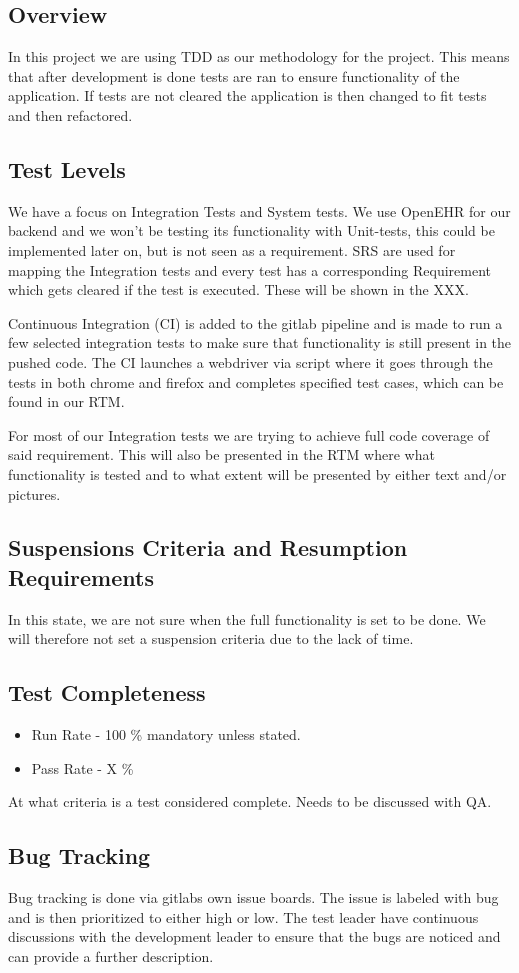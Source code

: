 \subsection{Overview}
In this project we are using TDD as our methodology for the project. This means that after development is done tests are ran to ensure functionality of the application. If tests are not cleared the application is then changed to fit tests and then refactored.  

\subsection{Test Levels}
We have a focus on Integration Tests and System tests. We use OpenEHR for our backend and we won't be testing its functionality with Unit-tests, this could be implemented later on, but is not seen as a requirement. SRS are used for mapping the Integration tests and every test has a corresponding Requirement which gets cleared if the test is executed. These will be shown in the XXX.

Continuous Integration (CI) is added to the gitlab pipeline and is made to run a few selected integration tests to make sure that functionality is still present in the pushed code. The CI launches a webdriver via script where it goes through the tests in both chrome and firefox and completes specified test cases, which can be found in our RTM.

For most of our Integration tests we are trying to achieve full code coverage of said requirement. This will also be presented in the RTM where what functionality is tested and to what extent will be presented by either text and/or pictures.


\subsection{Suspensions Criteria and Resumption Requirements}
In this state, we are not sure when the full functionality is set to be done. We will therefore not set a suspension criteria due to the lack of time.

\subsection{Test Completeness}
\begin{itemize}
    \item Run Rate - 100 \% mandatory unless stated.
    \item Pass Rate - X \%
\end{itemize}
At what criteria is a test considered complete. Needs to be discussed with QA. 

\subsection{Bug Tracking}
Bug tracking is done via gitlabs own issue boards. The issue is labeled with bug and is then prioritized to either high or low. The test leader have continuous discussions with the development leader to ensure that the bugs are noticed and can provide a further description.

\clearpage